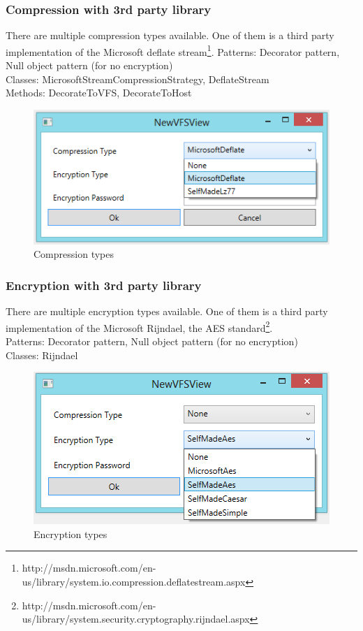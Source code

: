 \documentclass[JCDReport.tex]{subfiles}
\begin{document}
\subsubsection{Compression with 3rd party library}
There are multiple compression types available. One of them is a third party implementation of the Microsoft deflate stream\footnote{http://msdn.microsoft.com/en-us/library/system.io.compression.deflatestream.aspx}.
Patterns: Decorator pattern, Null object pattern (for no encryption)\\
Classes: MicrosoftStreamCompressionStrategy, DeflateStream\\
Methods: DecorateToVFS, DecorateToHost\\
\begin{figure}[h!]
	\centering
	\includegraphics[scale=1]{Images/compression_types.png} 
	\caption{Compression types}
\end{figure}

\subsubsection{Encryption with 3rd party library}
There are multiple encryption types available. One of them is a third party implementation of the Microsoft Rijndael, the AES standard\footnote{http://msdn.microsoft.com/en-us/library/system.security.cryptography.rijndael.aspx}.\\
Patterns: Decorator pattern, Null object pattern (for no encryption)\\
Classes: Rijndael\\
\begin{figure}[h!]
	\centering
	\includegraphics[scale=1]{Images/encryption_types.png} 
	\caption{Encryption types}
\end{figure}
\end{document}
